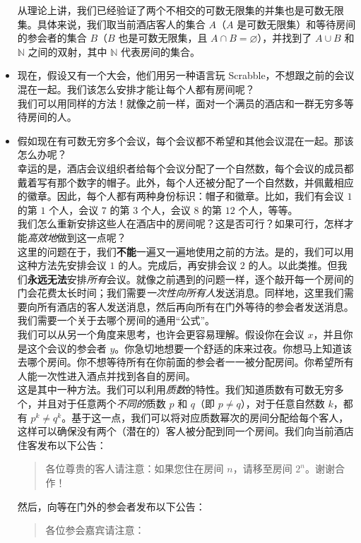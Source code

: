 \begin{itemize}
          从理论上讲，我们已经验证了两个不相交的可数无限集的并集也是可数无限集。具体来说，我们取当前酒店客人的集合 $A$（$A$ 是可数无限集）和等待房间的参会者的集合 $B$（$B$ 也是可数无限集，且 $A \cap B = \varnothing$），并找到了 $A \cup B$ 和 $\mathbb{N}$ 之间的双射，其中 $\mathbb{N}$ 代表房间的集合。\\
    \item 现在，假设又有一个大会，他们用另一种语言玩 Scrabble，不想跟之前的会议混在一起。我们该怎么安排才能让每个人都有房间呢？\\

          我们可以用同样的方法！就像之前一样，面对一个满员的酒店和一群无穷多等待房间的人。\\
    \item 假如现在有可数无穷多个会议，每个会议都不希望和其他会议混在一起。那该怎么办呢？\\

          幸运的是，酒店会议组织者给每个会议分配了一个自然数，每个会议的成员都戴着写有那个数字的帽子。此外，每个人还被分配了一个自然数，并佩戴相应的徽章。因此，每个人都有两种身份标识：帽子和徽章。比如，我们有会议 $1$ 的第 $1$ 个人，会议 $7$ 的第 $3$ 个人，会议 $8$ 的第 $12$ 个人，等等。\\

          我们怎么重新安排这些人在酒店中的房间呢？这是否可行？如果可行，怎样才能\emph{高效地}做到这一点呢？\\

          这里的问题在于，我们\textbf{不能}一遍又一遍地使用之前的方法。是的，我们可以用这种方法先安排会议 $1$ 的人。完成后，再安排会议 $2$ 的人。以此类推。但我们\textbf{永远无法}安排\emph{所有}会议。就像之前遇到的问题一样，逐个敲开每一个房间的门会花费太长时间；我们需要\emph{一次性向所有人}发送消息。同样地，这里我们需要向所有酒店的客人发送消息，然后再向所有在门外等待的参会者发送消息。我们需要一个关于去哪个房间的通用``公式''。\\

          我们可以从另一个角度来思考，也许会更容易理解。假设你在会议 $x$，并且你是这个会议的参会者 $y$。你急切地想要一个舒适的床来过夜。你想马上知道该去哪个房间。你不想等待所有在你前面的参会者一一被分配房间。你希望所有人能一次性进入酒点并找到各自的房间。\\

          这是其中一种方法。我们可以利用\emph{质数}的特性。我们知道质数有可数无穷多个，并且对于任意两个\emph{不同的}质数 $p$ 和 $q$（即 $p \ne q$），对于任意自然数 $k$，都有 $p^k \ne q^k$。基于这一点，我们可以将对应质数幂次的房间分配给每个客人，这样可以确保没有两个（潜在的）客人被分配到同一个房间。我们向当前酒店住客发布以下公告：
          \begin{quotation}
              各位尊贵的客人请注意：如果您住在房间 $n$，请移至房间 $2^n$。谢谢合作！
          \end{quotation}
          然后，向等在门外的参会者发布以下公告：
          \begin{quotation}
              各位参会嘉宾请注意：


\end{quotation}
\end{itemize}
